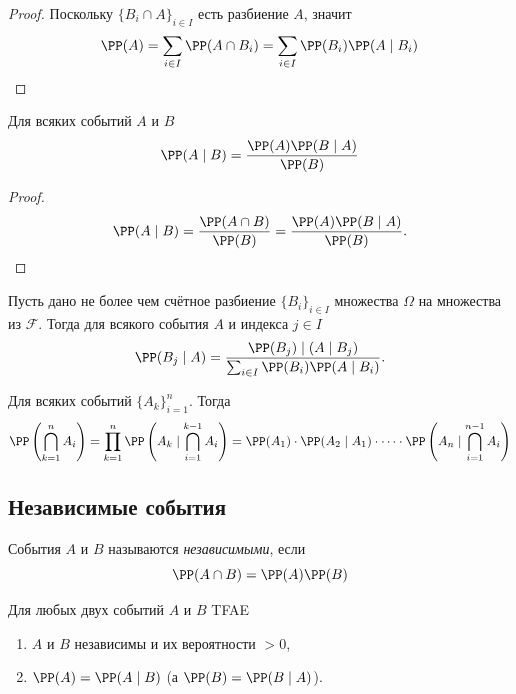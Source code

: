 \documentclass[12pt,a4paper]{article}
\begin{document}
    \begin{proof}
        Поскольку $\{B_i \cap A\}_{i \in I}$ есть разбиение $A$, значит
        \[\PP(A) = \sum_{i \in I} \PP(A \cap B_i) = \sum_{i \in I} \PP(B_i) \PP(A \mid B_i)\]
    \end{proof}

    \begin{lemma}
        Для всяких событий $A$ и $B$
        \[\PP(A \mid B) = \frac{\PP(A)\PP(B \mid A)}{\PP(B)}\]
    \end{lemma}

    \begin{proof}
        \[\PP(A \mid B) = \frac{\PP(A \cap B)}{\PP(B)} = \frac{\PP(A)\PP(B \mid A)}{\PP(B)}.\]
    \end{proof}

    \begin{corollary}
        Пусть дано не более чем счётное разбиение $\{B_i\}_{i \in I}$ множества $\Omega$ на множества из $\mathcal{F}$. Тогда для всякого события $A$ и индекса $j \in I$
        \[\PP(B_j \mid A) = \frac{\PP(B_j) \mid(A \mid B_j)}{\sum_{i \in I} \PP(B_i) \PP(A \mid B_i)}.\]
    \end{corollary}

    \begin{lemma}
        Для всяких событий $\{A_k\}_{i=1}^n$. Тогда
        \[\PP\left(\bigcap_{k=1}^n A_i\right) = \prod_{k=1}^n \PP\left(A_k \mid \bigcap_{i=1}^{k-1} A_i\right) = \PP(A_1) \cdot \PP(A_2 \mid A_1) \cdot \dots \cdot \PP\left(A_n \mid \bigcap_{i=1}^{n-1} A_i\right)\]
    \end{lemma}

    \subsection{Независимые события}

    \begin{definition}
        События $A$ и $B$ называются \emph{независимыми}, если
        \[\PP(A \cap B) = \PP(A) \PP(B)\]
    \end{definition}

    \begin{lemma}
        Для любых двух событий $A$ и $B$ TFAE
        \begin{enumerate}
            \item $A$ и $B$ независимы и их вероятности $>0$,
            \item $\PP(A) = \PP(A \mid B)$ (а $\PP(B) = \PP(B \mid A)$).
        \end{enumerate}
    \end{lemma}
\end{document}
